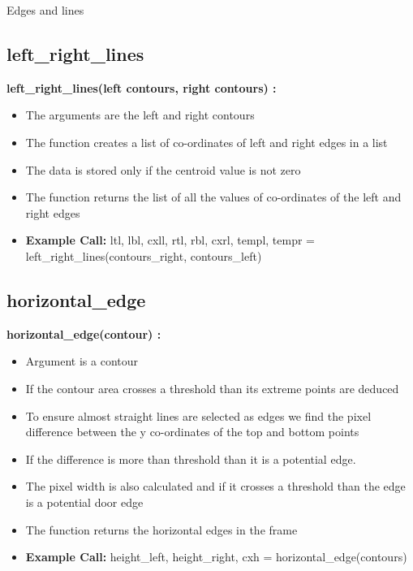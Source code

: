 \documentclass[10pt, a4paper]{beamer}
\begin{document}
\begin{frame}[allowframebreaks]{Edges and lines}
  \subsection{left\_right\_lines}
    \textbf{left\_right\_lines(left contours, right contours) : }
      \begin{itemize}
       \item The arguments are the left and right contours
       \item The function creates a list of co-ordinates of left and right edges in a list
       \item The data is stored only if the centroid value is not zero
       \item The function returns the list of all the values of co-ordinates of the left and right edges
       \item \textbf{Example Call:} ltl, lbl, cxll, rtl, rbl, cxrl, templ, tempr = left\_right\_lines(contours\_right, contours\_left)
      \end{itemize}
\framebreak
  \subsection{horizontal\_edge}
    \textbf{horizontal\_edge(contour) : }
      \begin{itemize}
       \item Argument is a contour
       \item If the contour area crosses a threshold than its extreme points are deduced
       \item To ensure almost straight lines are selected as edges we find the pixel difference between the y co-ordinates of the top and bottom points
       \item If the difference is more than threshold than it is a potential edge. 
       \item The pixel width is also calculated and if it crosses a threshold than the edge is a potential door edge
       \item The function returns the horizontal edges in the frame
       \item \textbf{Example Call:} height\_left, height\_right, cxh = horizontal\_edge(contours) 
      \end{itemize}
\framebreak

\end{frame}
\end{document}
